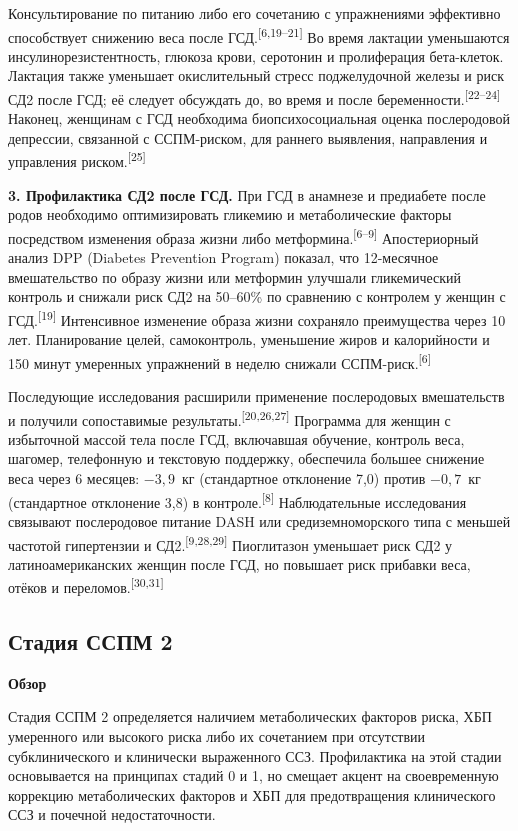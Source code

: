 \documentclass[11pt,a4paper]{article}
\newcommand{\src}[1]{\textsuperscript{[#1]}}
\newcommand{\heading}[1]{\par\medskip\textbf{#1}\par}
\begin{document}
Консультирование по питанию либо его сочетанию с упражнениями эффективно способствует снижению веса после ГСД.\src{6,19--21} Во время лактации уменьшаются инсулинорезистентность, глюкоза крови, серотонин и пролиферация бета-клеток. Лактация также уменьшает окислительный стресс поджелудочной железы и риск СД2 после ГСД; её следует обсуждать до, во время и после беременности.\src{22--24} Наконец, женщинам с ГСД необходима биопсихосоциальная оценка послеродовой депрессии, связанной с ССПМ-риском, для раннего выявления, направления и управления риском.\src{25}

\textbf{3. Профилактика СД2 после ГСД.} При ГСД в анамнезе и предиабете после родов необходимо оптимизировать гликемию и метаболические факторы посредством изменения образа жизни либо метформина.\src{6--9} Апостериорный анализ DPP (Diabetes Prevention Program) показал, что 12-месячное вмешательство по образу жизни или метформин улучшали гликемический контроль и снижали риск СД2 на 50--60\% по сравнению с контролем у женщин с ГСД.\src{19} Интенсивное изменение образа жизни сохраняло преимущества через 10 лет. Планирование целей, самоконтроль, уменьшение жиров и калорийности и 150 минут умеренных упражнений в неделю снижали ССПМ-риск.\src{6}

Последующие исследования расширили применение послеродовых вмешательств и получили сопоставимые результаты.\src{20,26,27} Программа для женщин с избыточной массой тела после ГСД, включавшая обучение, контроль веса, шагомер, телефонную и текстовую поддержку, обеспечила большее снижение веса через 6 месяцев: $-3{,}9$~кг (стандартное отклонение 7,0) против $-0{,}7$~кг (стандартное отклонение 3,8) в контроле.\src{8} Наблюдательные исследования связывают послеродовое питание DASH или средиземноморского типа с меньшей частотой гипертензии и СД2.\src{9,28,29} Пиоглитазон уменьшает риск СД2 у латиноамериканских женщин после ГСД, но повышает риск прибавки веса, отёков и переломов.\src{30,31}


\subsection{Стадия ССПМ 2}
\heading{Обзор}
Стадия ССПМ 2 определяется наличием метаболических факторов риска, ХБП умеренного или высокого риска либо их сочетанием при отсутствии субклинического и клинически выраженного ССЗ. Профилактика на этой стадии основывается на принципах стадий 0 и 1, но смещает акцент на своевременную коррекцию метаболических факторов и ХБП для предотвращения клинического ССЗ и почечной недостаточности.
\end{document}
